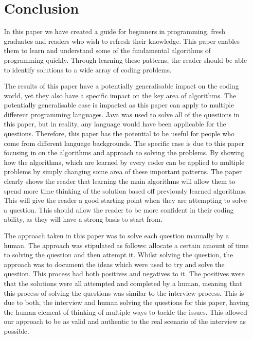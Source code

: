 \documentclass[10pt,twocolumn]{IEEEtran}
\begin{document}
\section{Conclusion}
In this paper we have created a guide for beginners in programming, fresh graduates and readers who wish to refresh their knowledge. This paper enables them to learn and understand some of the fundamental algorithms of programming quickly. Through learning these patterns, the reader should be able to identify solutions to a wide array of coding problems. 
\par The results of this paper have a potentially generalisable impact on the coding world, yet they also have a specific impact on the key area of algorithms. The potentially generalisable case is impacted as this paper can apply to multiple different programming languages. Java was used to solve all of the questions in this paper, but in reality, any language would have been applicable for the questions. Therefore, this paper has the potential to be useful for people who come from different language backgrounds. The specific case is due to this paper focusing in on the algorithms and approach to solving the problems. By showing how the algorithms, which are learned by every coder can be applied to multiple problems by simply changing some area of these important patterns. The paper clearly shows the reader that learning the main algorithms will allow them to spend more time thinking of the solution based off previously learned algorithms. This will give the reader a good starting point when they are attempting to solve a question. This should allow the reader to be more confident in their coding ability, as they will have a strong basis to start from. 
\par The approach taken in this paper was to solve each question manually by a human. The approach was stipulated as follows: allocate a certain amount of time to solving the question and then attempt it. Whilst solving the question, the approach was to document the ideas which were used to try and solve the question.  This process had both positives and negatives to it. The positives were that the solutions were all attempted and completed by a human, meaning that this process of solving the questions was similar to the interview process. This is due to both, the interview and human solving the questions for this paper, having the human element of thinking of multiple ways to tackle the issues. This allowed our approach to be as valid and authentic to the real scenario of the interview as possible.
\end{document}
